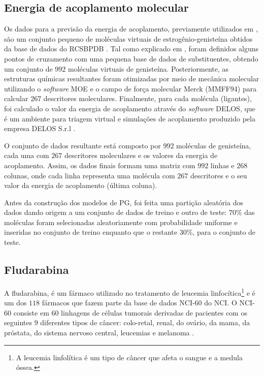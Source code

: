 \subsection{Energia de acoplamento molecular}

Os dados para a previsão da energia de acoplamento, previamente utilizados em \citep{archetti2010genetic}, são um conjunto pequeno de 
moléculas virtuais de estrogênio-genisteína obtidos da base de dados do \ac{RCSBPDB} \citep{RCSB2007}. Tal como explicado em \citep{archetti2010genetic}, foram definidos alguns pontos de cruzamento com uma 
pequena base de dados de substituentes, obtendo um conjunto de $992$ moléculas virtuais de genisteína. Posteriormente, as estruturas químicas 
resultantes foram otimizadas por meio de mecânica molecular utilizando o \emph{software} \ac{MOE} \citep{MOE2007}
e o campo de força molecular Merck (\ac{MMFF94}) \citep{halgren1996merck} para calcular $267$
descritores moleculares. Finalmente, para cada molécula (ligantes), foi calculado o valor da energia de acoplamento através do \emph{software}
\ac{DELOS}, que é um ambiente para triagem virtual e simulações de acoplamento produzido pela empresa DELOS S.r.l \citep{DELOS2007}.

O conjunto de dados resultante está composto por $992$ moléculas de genisteína, cada uma com $267$ descritores moleculares e os valores da 
energia de acoplamento. Assim, os dados finais formam uma matriz com $992$ linhas e $268$ colunas, onde cada linha representa uma
molécula com $267$ descritores e o seu valor da energia de acoplamento (última coluna).

Antes da construção dos modelos de \ac{PG}, foi feita uma partição aleatória dos dados dando origem a um conjunto de dados de treino e outro de teste: $70\%$ das 
moléculas foram selecionadas aleatoriamente com probabilidade uniforme e inseridas no conjunto de treino enquanto que o restante $30\%$, para o 
conjunto de teste.

\subsection{Fludarabina}

A fludarabina, é um fármaco utilizado no tratamento de leucemia linfocítica\footnote{A leucemia linfolítica é um tipo de câncer que afeta o sangue e a medula óssea.}
e é um dos $118$ fármacos que fazem parte da base de dados NCI-60 do \ac{NCI}. O NCI-60 consiste em $60$ linhagens de células tumorais derivadas de pacientes com os seguintes $9$ diferentes tipos de 
câncer: colo-retal, renal, do ovário, da mama, da próstata, do sistema nervoso central, leucemias e melanoma \citep{del2007gene}.

